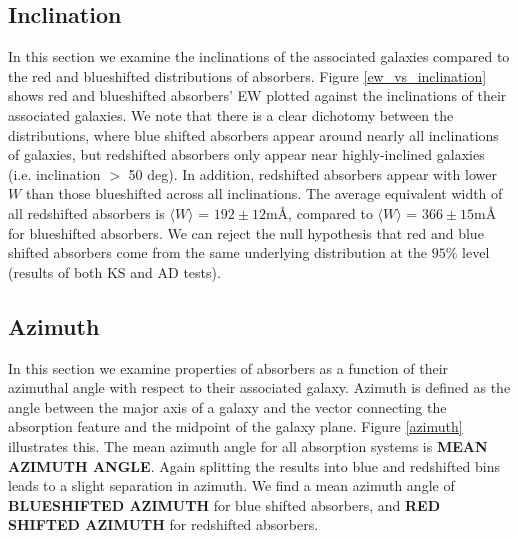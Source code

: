 \documentclass[iop]{emulateapj-rtx4}
\begin{document}
\subsection{Inclination}
In this section we examine the inclinations of the associated galaxies compared to the red and blueshifted distributions of absorbers. Figure \ref{ew_vs_inclination} shows red and blueshifted absorbers' EW plotted against the inclinations of their associated galaxies. We note that there is a clear dichotomy between the distributions, where blue shifted absorbers appear around nearly all inclinations of galaxies, but redshifted absorbers only appear near highly-inclined galaxies (i.e. inclination $>$ 50 deg). In addition, redshifted absorbers appear with lower $W$ than those blueshifted across all inclinations. The average equivalent width of all redshifted absorbers is $\langle W \rangle$ = $192 \pm 12 \textrm{m\AA}$, compared to $\langle W \rangle$ = $366 \pm 15\textrm{m\AA}$ for blueshifted absorbers. We can reject the null hypothesis that red and blue shifted absorbers come from the same underlying distribution at the $95\%$ level (results of both KS and AD tests).


\subsection{Azimuth}
In this section we examine properties of absorbers as a function of their azimuthal angle with respect to their associated galaxy. Azimuth is defined as the angle between the major axis of a galaxy and the vector connecting the absorption feature and the midpoint of the galaxy plane. Figure \ref{azimuth} illustrates this. The mean azimuth angle for all absorption systems is \textbf{MEAN AZIMUTH ANGLE}. Again splitting the results into blue and redshifted bins leads to a slight separation in azimuth. We find a mean azimuth angle of \textbf{BLUESHIFTED AZIMUTH} for blue shifted absorbers, and \textbf{RED SHIFTED AZIMUTH} for redshifted absorbers. 

\end{document}

